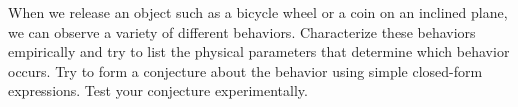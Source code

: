 When we release an object such as a bicycle wheel or a coin on an inclined plane, we can observe
a variety of different behaviors. Characterize these behaviors empirically and try to list the physical
parameters that determine which behavior occurs. Try to form a conjecture about the behavior
using simple closed-form expressions. Test your conjecture experimentally.
